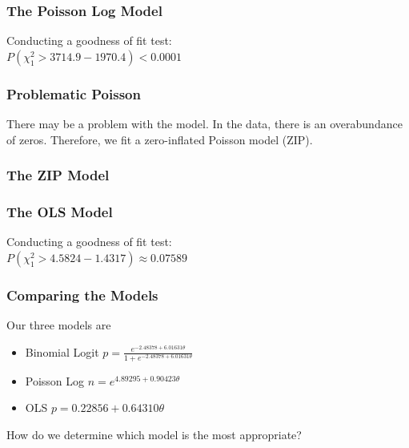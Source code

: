 \begin{frame}\frametitle{The Poisson Log Model}
{\fontsize{8}{3} \color{RBlue} }

Conducting a goodness of fit test: \\
$P(\chi^{2}_{1}>3714.9-1970.4)<0.0001$\\

\end{frame}




\begin{frame}\frametitle{Problematic Poisson}
There may be a problem with the model.
In the data, there is an overabundance of zeros.
Therefore, we fit a zero-inflated Poisson model (ZIP).
{\fontsize{8}{3} \color{RBlue} }
\end{frame}

\begin{frame}\frametitle{The ZIP Model}
{\fontsize{8}{3} \color{RBlue} }
\end{frame}

\begin{frame}\frametitle{The OLS Model}
{\fontsize{8}{3} \color{RBlue} }

Conducting a goodness of fit test: \\
$P(\chi^{2}_{1}>4.5824-1.4317)\approx0.07589$\\

\end{frame}

\begin{frame}\frametitle{Comparing the Models}
Our three models are \\
\begin{itemize}
\item Binomial Logit $p=\frac{e^{-2.48378+6.01631\theta}}{1+e^{-2.48378+6.01631\theta}}$\\
\item Poisson Log $n=e^{4.89295+0.90423\theta}$\\
\item OLS $p=0.22856+0.64310\theta$\\
\end{itemize}
How do we determine which model is the most appropriate?\\
\end{frame}

